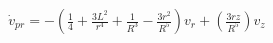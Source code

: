 \documentclass[preview]{standalone}
\begin{document}
\begin{align*}
\dot{v}_{pr}=-\left(\frac{1}{4}+\frac{3L^2}{r^4}+\frac{1}{R^3}-\frac{3 r^2}{R^5}\right)v_r+\left(\frac{3rz}{R^5}\right)v_z
\end{align*}
\end{document}
